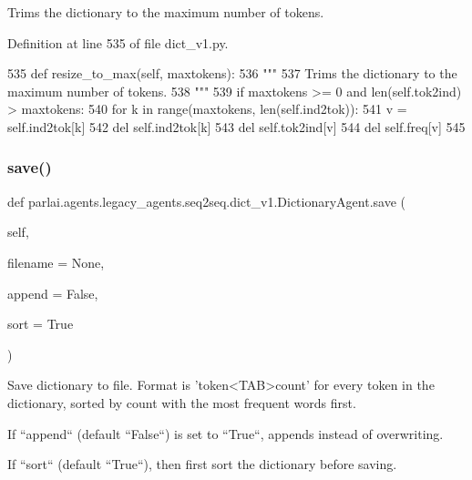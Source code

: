 \begin{DoxyVerb}Trims the dictionary to the maximum number of tokens.
\end{DoxyVerb}
 

Definition at line 535 of file dict\+\_\+v1.\+py.


\begin{DoxyCode}
535     \textcolor{keyword}{def }resize\_to\_max(self, maxtokens):
536         \textcolor{stringliteral}{"""}
537 \textcolor{stringliteral}{        Trims the dictionary to the maximum number of tokens.}
538 \textcolor{stringliteral}{        """}
539         \textcolor{keywordflow}{if} maxtokens >= 0 \textcolor{keywordflow}{and} len(self.tok2ind) > maxtokens:
540             \textcolor{keywordflow}{for} k \textcolor{keywordflow}{in} range(maxtokens, len(self.ind2tok)):
541                 v = self.ind2tok[k]
542                 del self.ind2tok[k]
543                 del self.tok2ind[v]
544                 del self.freq[v]
545 
\end{DoxyCode}
\mbox{\label{classparlai_1_1agents_1_1legacy__agents_1_1seq2seq_1_1dict__v1_1_1DictionaryAgent_aacac3c53a7aef02a731d427fcb8bdf87}} 
\subsubsection{\texorpdfstring{save()}{save()}}
{\footnotesize\ttfamily def parlai.\+agents.\+legacy\+\_\+agents.\+seq2seq.\+dict\+\_\+v1.\+Dictionary\+Agent.\+save (\begin{DoxyParamCaption}\item[{}]{self,  }\item[{}]{filename = {\ttfamily None},  }\item[{}]{append = {\ttfamily False},  }\item[{}]{sort = {\ttfamily True} }\end{DoxyParamCaption})}

\begin{DoxyVerb}Save dictionary to file. Format is 'token<TAB>count' for every token in the
dictionary, sorted by count with the most frequent words first.

If ``append`` (default ``False``) is set to ``True``, appends instead of
overwriting.

If ``sort`` (default ``True``), then first sort the dictionary before saving.
\end{DoxyVerb}
 

